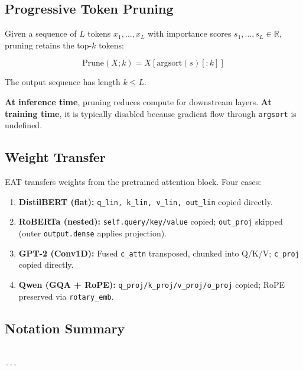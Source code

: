 \subsection{Progressive Token Pruning}

Given a sequence of $L$ tokens $x_1, \dots, x_L$ with importance scores 
$s_1, \dots, s_L \in \mathbb{R}$, pruning retains the top-$k$ tokens:

\[
\text{Prune}(X; k) = X[\text{argsort}(s)[:k]]
\tag{3.6}
\]

The output sequence has length $k \leq L$.

\textbf{At inference time}, pruning reduces compute for downstream layers. 
\textbf{At training time}, it is typically disabled because gradient flow through 
\texttt{argsort} is undefined.

\subsection{Weight Transfer}

EAT transfers weights from the pretrained attention block. Four cases:

\begin{enumerate}
\item \textbf{DistilBERT (flat):} \texttt{q\_lin, k\_lin, v\_lin, out\_lin} copied directly.
\item \textbf{RoBERTa (nested):} \texttt{self.query/key/value} copied; \texttt{out\_proj} skipped
  (outer \texttt{output.dense} applies projection).
\item \textbf{GPT-2 (Conv1D):} Fused \texttt{c\_attn} transposed, chunked into Q/K/V;
  \texttt{c\_proj} copied directly.
\item \textbf{Qwen (GQA + RoPE):} \texttt{q\_proj/k\_proj/v\_proj/o\_proj} copied; RoPE
  preserved via \texttt{rotary\_emb}.

\end{enumerate}
\subsection{Notation Summary}

\begin{lstlisting}

---
\end{lstlisting}